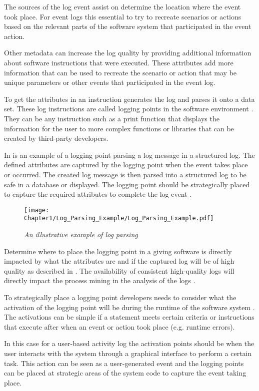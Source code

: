 The sources of the log event assist on determine the location where the event took place. For event logs this essential to try to recreate scenarios or actions based on the relevant parts of the software system that participated in the event action.\par Other metadata can increase the log quality by providing additional information about software instructions that were executed. These attributes add more information that can be used to recreate the scenario or action that may be unique parameters or other events that participated in the event log.\par To get the attributes in  an instruction generates the log and parses it onto a data set. These log instructions are called logging points in the software environment \cite{Pecchia2015, Zhu2015}. They can be any instruction such as a print function that displays the information for the user to more complex functions or libraries that can be created by third-party developers.

In  is an example of a logging point parsing a log message in a structured log. The defined attributes are captured by the logging point when the event takes place or occurred. The created log message is then parsed into a structured log to be safe in a database or displayed. The logging point should be strategically placed to capture the required attributes to complete the log event \cite{Fedaghi2010}.

\begin{figure}[!htb]
	\centering %
	\texttt{[image: Chapter1/Log\_Parsing\_Example/Log\_Parsing\_Example.pdf]}
	\caption[An illustrative example of log parsing]
	{\textit{An illustrative example of log parsing \cite{Zhu2019}}} \label{fig:ch1_logParsing}
\end{figure}

Determine where to place the logging point in a giving software is directly impacted by what the attributes are and if the captured log will be of high quality as described in . The availability of consistent high-quality logs will directly impact the process mining in the analysis of the logs \cite{Kherbouche2017}.\par To strategically place a logging point developers needs to consider what the activation of the logging point will be during the runtime of the software system \cite{Pecchia2015, Cinque2013}. The activations can be simple if a statement meets certain criteria or instructions that execute after when an event or action took place (e.g. runtime errors). \par In this case for a user-based activity log the activation points should be when the user interacts with the system through a graphical interface to perform a certain task. This action can be seen as a user-generated event and the logging points can be placed at strategic areas of the system code to capture the event taking place. 

